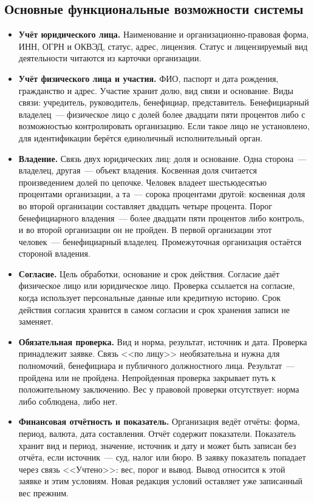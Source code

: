 \subsection{Основные функциональные возможности системы}

\begin{itemize}
\item \textbf{Учёт юридического лица.} Наименование и организационно-правовая форма, ИНН, ОГРН и ОКВЭД, статус, адрес, лицензия. Статус и лицензируемый вид деятельности читаются из карточки организации.
\item \textbf{Учёт физического лица и участия.} ФИО, паспорт и дата рождения, гражданство и адрес. Участие хранит долю, вид связи и основание. Виды связи: учредитель, руководитель, бенефициар, представитель. Бенефициарный владелец~--- физическое лицо с долей более двадцати пяти процентов либо с возможностью контролировать организацию. Если такое лицо не установлено, для идентификации берётся единоличный исполнительный орган.
\item \textbf{Владение.} Связь двух юридических лиц: доля и основание. Одна сторона~--- владелец, другая~--- объект владения. Косвенная доля считается произведением долей по цепочке. Человек владеет шестьюдесятью процентами организации, а та~--- сорока процентами другой: косвенная доля во второй организации составляет двадцать четыре процента. Порог бенефициарного владения~--- более двадцати пяти процентов либо контроль, и во второй организации он не пройден. В первой организации этот человек~--- бенефициарный владелец. Промежуточная организация остаётся стороной владения.
\item \textbf{Согласие.} Цель обработки, основание и срок действия. Согласие даёт физическое лицо или юридическое лицо. Проверка ссылается на согласие, когда использует персональные данные или кредитную историю. Срок действия согласия хранится в самом согласии и срок хранения записи не заменяет.
\item \textbf{Обязательная проверка.} Вид и норма, результат, источник и дата. Проверка принадлежит заявке. Связь <<по лицу>> необязательна и нужна для полномочий, бенефициара и публичного должностного лица. Результат~--- пройдена или не пройдена. Непройденная проверка закрывает путь к положительному заключению. Вес у правовой проверки отсутствует: норма либо соблюдена, либо нет.
\item \textbf{Финансовая отчётность и показатель.} Организация ведёт отчёты: форма, период, валюта, дата составления. Отчёт содержит показатели. Показатель хранит вид и период, значение, источник и дату и может быть записан без отчёта, если источник~--- суд, налог или бюро. В заявку показатель попадает через связь <<Учтено>>: вес, порог и вывод. Вывод относится к этой заявке и этим условиям. Новая редакция условий оставляет уже записанный вес прежним.

\end{itemize}
